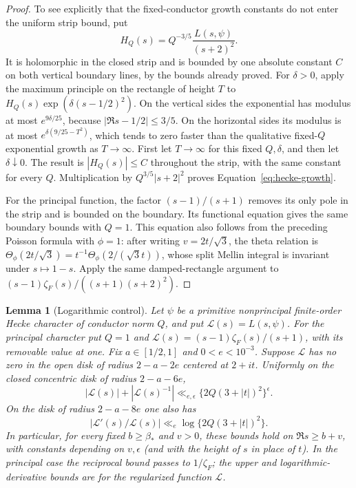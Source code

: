 \documentclass[12pt]{article}
\newtheorem{lemma}[theorem]{Lemma}
\begin{document}
\begin{proof}
To see explicitly that the fixed-conductor growth constants do not enter
the uniform strip bound, put
\[
 H_Q(s)=Q^{-3/5}\frac{L(s,\psi)}{(s+2)^2}.
\]
It is holomorphic in the closed strip and is bounded by one absolute
constant $C$ on both vertical boundary lines, by the bounds already proved.
For $\delta>0$, apply the maximum principle on the rectangle of height $T$
to $H_Q(s)\exp(\delta(s-1/2)^2)$.  On the vertical sides the exponential
has modulus at most $e^{9\delta/25}$, because
$|\Re s-1/2|\le3/5$.  On the horizontal sides its modulus is at most
$e^{\delta(9/25-T^2)}$, which tends to zero faster than the qualitative
fixed-$Q$ exponential growth as $T\to\infty$.  First let $T\to\infty$ for
this fixed $Q,\delta$, and then let $\delta\downarrow0$.  The result is
$|H_Q(s)|\le C$ throughout the strip, with the same constant for every $Q$.
Multiplication by $Q^{3/5}|s+2|^2$ proves
Equation~\eqref{eq:hecke-growth}.

For the principal function, the factor $(s-1)/(s+1)$ removes its only pole
in the strip and is bounded on the boundary.  Its functional equation gives
the same boundary bounds with $Q=1$.  This equation also follows from the
preceding Poisson formula with $\phi=1$: after writing $v=2t/\sqrt3$, the
theta relation is
$\Theta_\phi(2t/\sqrt3)=t^{-1}\Theta_\phi(2/(\sqrt3t))$, whose split Mellin
integral is invariant under $s\mapsto1-s$.  Apply the same damped-rectangle
argument to $(s-1)\zeta_F(s)/((s+1)(s+2)^2)$.
\end{proof}

\begin{lemma}[Logarithmic control]\label{lem:logarithmic-control}
Let $\psi$ be a primitive nonprincipal finite-order Hecke character of
conductor norm $Q$, and put $\mathcal L(s)=L(s,\psi)$.  For the principal
character put $Q=1$ and
$\mathcal L(s)=(s-1)\zeta_F(s)/(s+1)$, with its removable value at one.
Fix $a\in[1/2,1]$ and $0<e<10^{-3}$.  Suppose $\mathcal L$ has no zero in
the open disk of radius $2-a-2e$ centered at $2+it$.  Uniformly on the
closed concentric disk of radius $2-a-6e$,
\begin{equation}\label{eq:disk-control}
 |\mathcal L(s)|+|\mathcal L(s)^{-1}|
 \ll_{e,\epsilon}\{2Q(3+|t|)^2\}^{\epsilon}.
\end{equation}
On the disk of radius $2-a-8e$ one also has
\[
 |\mathcal L'(s)/\mathcal L(s)|\ll_e\log\{2Q(3+|t|)^2\}.
\]
In particular, for every fixed $b\ge\beta_*$ and $v>0$, these bounds hold
on $\Re s\ge b+v$, with constants depending on $v,\epsilon$ (and with the
height of $s$ in place of $t$).  In the principal case the reciprocal bound
passes to $1/\zeta_F$; the upper and logarithmic-derivative bounds are for
the regularized function $\mathcal L$.
\end{lemma}
\end{document}
